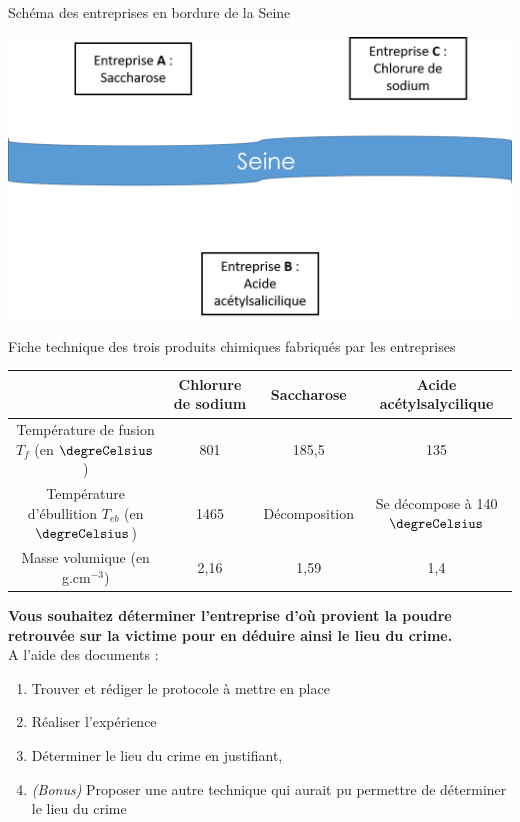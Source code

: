 \begin{doc}{Schéma des entreprises en bordure de la Seine}
\begin{center}
    \includegraphics[scale=0.5]{Images/Entreprise.png}
\end{center}
\end{doc}
\newpage
\begin{doc}{Fiche technique des trois produits chimiques fabriqués par les entreprises}
\newline
    \begin{tabular}{|C{0.4}|C{0.1}|C{0.2}|C{0.2}|}
    \hline
     & Chlorure de sodium & Saccharose & Acide acétylsalycilique \\
    \hline
    Température de fusion $T_{f}$ \newline (en $\degreCelsius$) & 801 & 185,5 & 135 \\
    \hline
    Température d'ébullition $T_{eb}$ \newline (en $\degreCelsius$) & 1465 & Décomposition & Se décompose à 140 $\degreCelsius$ \\
    \hline
    Masse volumique (en g.cm$^{-3}$) & 2,16 & 1,59 & 1,4 \\
    \hline
    \end{tabular}
\end{doc}

\textbf{Vous souhaitez déterminer l’entreprise d’où provient la poudre retrouvée sur la victime pour en déduire ainsi le lieu du crime.}\\
A l’aide des documents :
\begin{enumerate}
    \item Trouver et rédiger le protocole à mettre en place
    \item Réaliser l’expérience
    \item Déterminer le lieu du crime en justifiant,
    \item \textit{(Bonus)} Proposer une autre technique qui aurait pu permettre de déterminer le lieu du crime
\end{enumerate}

